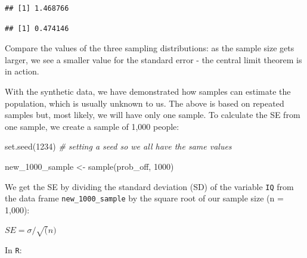 \documentclass[
]{book}
\newenvironment{Shaded}{\begin{snugshade}}{\end{snugshade}}
\newcommand{\CommentTok}[1]{\textcolor[rgb]{0.56,0.35,0.01}{\textit{#1}}}
\newcommand{\DecValTok}[1]{\textcolor[rgb]{0.00,0.00,0.81}{#1}}
\newcommand{\FunctionTok}[1]{\textcolor[rgb]{0.00,0.00,0.00}{#1}}
\newcommand{\NormalTok}[1]{#1}
\newcommand{\OtherTok}[1]{\textcolor[rgb]{0.56,0.35,0.01}{#1}}
\newcommand{\SpecialCharTok}[1]{\textcolor[rgb]{0.00,0.00,0.00}{#1}}
\begin{document}
\begin{Shaded}
\end{Shaded}

\begin{verbatim}
## [1] 1.468766
\end{verbatim}

\begin{Shaded}
\end{Shaded}

\begin{verbatim}
## [1] 0.474146
\end{verbatim}

Compare the values of the three sampling distributions: as the sample size gets larger, we see a smaller value for the standard error - the central limit theorem is in action.

With the synthetic data, we have demonstrated how samples can estimate the population, which is usually unknown to us. The above is based on repeated samples but, most likely, we will have only one sample. To calculate the SE from one sample, we create a sample of 1,000 people:

\begin{Shaded}
\begin{Highlighting}[]
\FunctionTok{set.seed}\NormalTok{(}\DecValTok{1234}\NormalTok{) }\CommentTok{\# setting a seed so we all have the same values}

\NormalTok{new\_1000\_sample }\OtherTok{\textless{}{-}} \FunctionTok{sample}\NormalTok{(prob\_off, }\DecValTok{1000}\NormalTok{)}
\end{Highlighting}
\end{Shaded}

We get the SE by dividing the standard deviation (SD) of the variable \texttt{IQ} from the data frame \texttt{new\_1000\_sample} by the square root of our sample size (n = 1,000):

\(SE = \sigma/\sqrt(n)\)

In \texttt{R}:

\begin{Shaded}
\end{Shaded}
\end{document}
